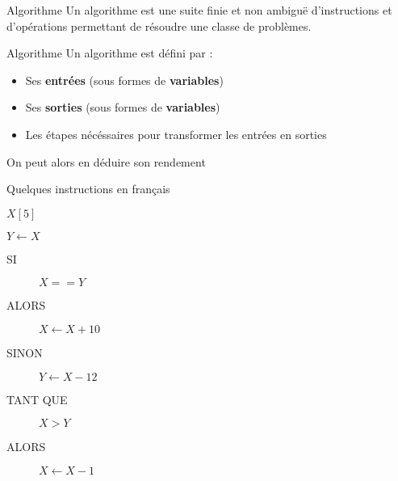 \begin{frame}{Algorithme}
    Un algorithme est une suite finie et non ambiguë d'instructions et d’opérations permettant de résoudre une classe de problèmes.
\end{frame}

\begin{frame}{Algorithme}
    Un algorithme est défini par :
    \begin{itemize}
        \item Ses \textbf{entrées} (sous formes de \textbf{variables})
        \item Ses \textbf{sorties} (sous formes de \textbf{variables})
        \item Les étapes nécéssaires pour transformer les entrées en sorties
    \end{itemize}
    On peut alors en déduire son rendement
\end{frame}

\begin{frame}{Quelques instructions en français}
    
    \begin{description}[<+->]
        \item [\blue{ACCES}] $X[5]\;\;\;\;\;$ 
        \item []
        \item [\blue{AFFECTATION}] $Y \leftarrow X\;$  
        \item []
        \item [\blue{TEST}] 
        \begin{description}
            \item [SI] $X == Y$
            \item [ALORS] $X \leftarrow X + 10$
            \item [SINON] $Y \leftarrow X - 12$
        \end{description}
        \item []
        \item [\blue{BOUCLE}] 
        \begin{description}
            \item [TANT QUE] $X > Y$
            \item [ALORS] $X \leftarrow X - 1$
        \end{description}
    \end{description}

    
\end{frame}

